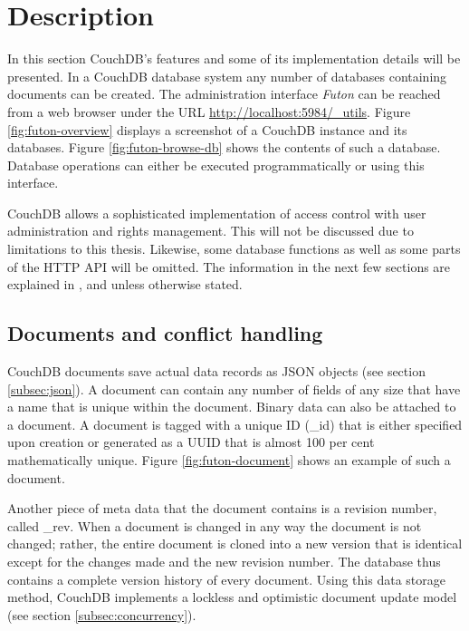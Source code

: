 \section{Description}
\label{sec:technisch-couchdb}

In this section CouchDB's features and some of its implementation details will be presented. In a CouchDB database system any number of databases containing documents can be created. The administration interface \textit{Futon} can be reached from a web browser under the URL {\url{http://localhost:5984/_utils}}. Figure \ref{fig:futon-overview} displays a screenshot of a CouchDB instance and its databases. Figure \ref{fig:futon-browse-db} shows the contents of such a database. Database operations can either be executed programmatically or using this interface.

CouchDB allows a sophisticated implementation of access control with user administration and rights management. This will not be discussed due to limitations to this thesis. Likewise, some database functions as well as some parts of the HTTP API will be omitted. The information in the next few sections are explained in , \cite{couch:overview} and \cite{couchdb:ibm} unless otherwise stated.


\subsection{Documents and conflict handling}
\label{subsec:dokumente}

CouchDB documents save actual data records as JSON objects (see section \ref{subsec:json}). A document can contain any number of fields of any size that have a name that is unique within the document. Binary data can also be attached to a document. A document is tagged with a unique ID ({\selectfont \_id}) that is either specified upon creation or generated as a UUID that is almost 100 per cent mathematically unique. Figure \ref{fig:futon-document} shows an example of such a document.

Another piece of meta data that the document contains is a revision number, called {\selectfont \_rev}. When a document is changed in any way the document is not changed; rather, the entire document is cloned into a new version that is identical except for the changes made and the new revision number. The database thus contains a complete version history of every document. Using this data storage method, CouchDB implements a lockless and optimistic document update model (see section \ref{subsec:concurrency}).

